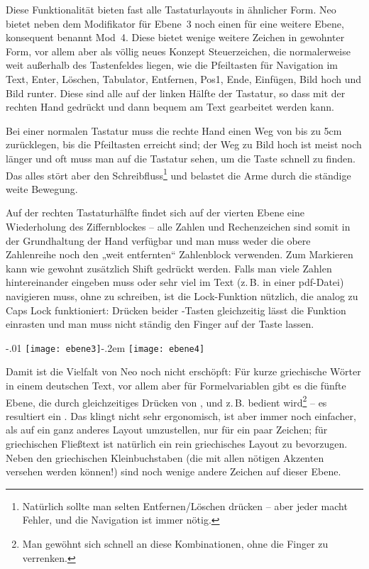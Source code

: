 \documentclass[ngerman]{dtk}
\newcommand{\taste}[1]{\makebox{\textsf{#1}}}
\begin{document}
{Diese Funktionalität bieten fast alle Tastaturlayouts in ähnlicher Form. Neo bietet neben dem Modifikator für Ebene~3 noch einen für eine weitere Ebene, konsequent benannt Mod~4. Diese bietet wenige weitere Zeichen in gewohnter Form, vor allem aber als völlig neues Konzept Steuerzeichen, die normalerweise weit außerhalb des Tastenfeldes liegen, wie die Pfeiltasten für Navigation im Text, Enter, Löschen, Tabulator, Entfernen, Pos1, Ende, Einfügen, Bild hoch und Bild runter. Diese sind alle auf der linken Hälfte der Tastatur, so dass mit der rechten Hand \taste{Mod 4} gedrückt und dann bequem am Text gearbeitet werden kann.

Bei einer normalen Tastatur muss die rechte Hand einen Weg von bis zu 5cm zurücklegen, bis die Pfeiltasten erreicht sind; der Weg zu Bild hoch ist meist noch länger und oft muss man auf die Tastatur sehen, um die Taste schnell zu finden. Das alles stört aber den Schreibfluss\footnote{Natürlich sollte man selten Entfernen/Löschen drücken – aber jeder macht Fehler, und die Navigation ist immer nötig.} und belastet die Arme durch die ständige weite Bewegung.

Auf der rechten Tastaturhälfte findet sich auf der vierten Ebene eine Wiederholung des Ziffernblockes – alle Zahlen und Rechenzeichen sind somit in der Grundhaltung der Hand verfügbar und man muss weder die obere Zahlenreihe noch den „weit entfernten“ Zahlenblock verwenden. Zum Markieren kann wie gewohnt zusätzlich Shift gedrückt werden. Falls man viele Zahlen hintereinander eingeben muss oder sehr viel im Text (z.\,B. in einer pdf-Datei) navigieren muss, ohne zu schreiben, ist die Lock-Funktion nützlich, die analog zu Caps Lock funktioniert: Drücken beider \taste{Mod 4}-Tasten gleichzeitig lässt die Funktion einrasten und man muss nicht ständig den Finger auf der Taste lassen.

\begin{center}
\leavevmode\kern-.01\textwidth%
\texttt{[image: ebene3]}\kern-.2em%
\texttt{[image: ebene4]}
\end{center}

Damit ist die Vielfalt von Neo noch nicht erschöpft: Für kurze griechische Wörter in einem deutschen Text, vor allem aber für Formelvariablen gibt es die fünfte Ebene, die durch gleichzeitiges Drücken von \taste{Shift}, \taste{Mod 3} und z.\,B. \taste{a} bedient wird\footnote{Man gewöhnt sich schnell an diese Kombinationen, ohne die Finger zu verrenken.} – es resultiert ein \taste{$\alpha$}. Das klingt nicht sehr ergonomisch, ist aber immer noch einfacher, als auf ein ganz anderes Layout umzustellen, nur für ein paar Zeichen; für griechischen Fließtext ist natürlich ein rein griechisches Layout zu bevorzugen. Neben den griechischen Kleinbuchstaben (die mit allen nötigen Akzenten versehen werden können!) sind noch wenige andere Zeichen auf dieser Ebene.

}
\end{document}
